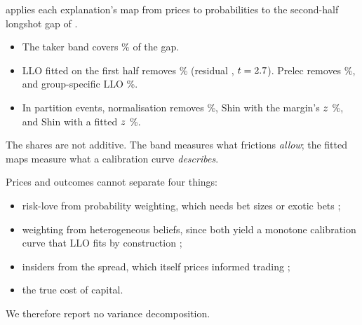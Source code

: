  applies each explanation's map from prices to probabilities to the second-half
longshot gap of \sdCfGross\cents.
\begin{itemize}
  \item The taker band covers \sdCfBandShare\% of the gap.
  \item LLO fitted on the first half removes \sdCfLloShare\% (residual \sdCfLloResid\cents, $t=2.7$).
  Prelec removes \sdCfPrelecShare\%, and group-specific LLO \sdCfLloGroupShare\%.
  \item In partition events, normalisation removes \sdCfNormShare\%, Shin with the margin's $z$
  \sdCfShinAskShare\%, and Shin with a fitted $z$ \sdCfShinFitShare\%.
\end{itemize}
The shares are not additive. The band measures what frictions \emph{allow}; the fitted maps measure what a
calibration curve \emph{describes}.

Prices and outcomes cannot separate four things:
\begin{itemize}
  \item risk-love from probability weighting, which needs bet sizes or exotic bets \citep{snowbergwolfers2010};
  \item weighting from heterogeneous beliefs, since both yield a monotone calibration curve that LLO fits by
  construction \citep{gandhi2015,manski2006};
  \item insiders from the spread, which itself prices informed trading \citep{glostenmilgrom1985};
  \item the true cost of capital.
\end{itemize}
We therefore report no variance decomposition.

